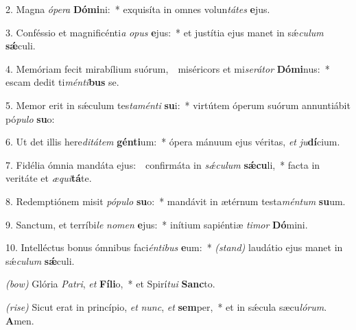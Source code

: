 2. Magna \textit{ó}\textit{pe}\textit{ra} \textbf{Dó}\textbf{mi}ni:~* 
	exquisíta in omnes volun\textit{tá}\textit{tes} \textbf{e}jus.

3. Conféssio et magnificénti\textit{a} \textit{o}\textit{pus} \textbf{e}jus:~* 
	et justítia ejus manet in sǽ\textit{cu}\textit{lum} \textbf{sǽ}culi.

4. Memóriam fecit mirabílium suórum,~{\color{red}\GreDagger}\ miséricors et mi\textit{se}\textit{rá}\textit{tor} \textbf{Dó}\textbf{mi}nus:~* 
	escam dedit ti\textit{mén}\textit{ti}\textbf{bus} se.

5. Memor erit in sǽculum tes\textit{ta}\textit{mén}\textit{ti} \textbf{su}i:~* 
	virtútem óperum suórum annuntiábit pó\textit{pu}\textit{lo} \textbf{su}o:

6. Ut det illis here\textit{di}\textit{tá}\textit{tem} \textbf{gén}\textbf{ti}um:~* 
	ópera mánuum ejus véritas, \textit{et} \textit{ju}\textbf{dí}cium.

7. Fidélia ómnia mandáta ejus:~{\color{red}\GreDagger}\ confirmáta in \textit{sǽ}\textit{cu}\textit{lum} \textbf{sǽ}\textbf{cu}li,~* 
	facta in veritáte et \textit{æ}\textit{qui}\textbf{tá}te.

8. Redemptiónem misit \textit{pó}\textit{pu}\textit{lo} \textbf{su}o:~* 
	mandávit in ætérnum testa\textit{mén}\textit{tum} \textbf{su}um.

9. Sanctum, et terríbi\textit{le} \textit{no}\textit{men} \textbf{e}jus:~* 
	inítium sapiéntiæ \textit{ti}\textit{mor} \textbf{Dó}mini.

10. Intelléctus bonus ómnibus faci\textit{én}\textit{ti}\textit{bus} \textbf{e}um:~* 
	{\color{red}\textit{(stand)}} laudátio ejus manet in sǽ\textit{cu}\textit{lum} \textbf{sǽ}culi.

{\color{red}\textit{(bow)}} Glória \textit{Pa}\textit{tri}, \textit{et} \textbf{Fí}\textbf{li}o,~* 
	et Spirí\textit{tu}\textit{i} \textbf{Sanc}to.

{\color{red}\textit{(rise)}} Sicut erat in princípio, \textit{et} \textit{nunc}, \textit{et} \textbf{sem}per,~* 
	et in sǽcula sæcu\textit{ló}\textit{rum}. \textbf{A}men.